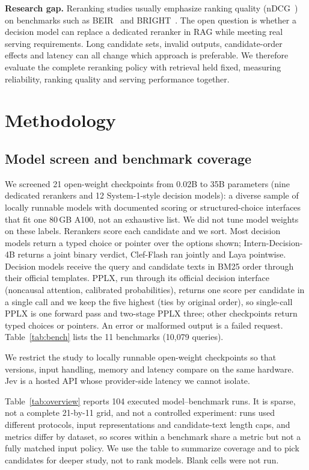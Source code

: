 \documentclass[conference]{IEEEtran}
\begin{document}
{\textbf{Research gap.} Reranking studies usually emphasize ranking quality (nDCG~\cite{jarvelin2002ndcg}) on benchmarks such as BEIR~\cite{thakur2021beir} and BRIGHT~\cite{su2025bright}. The open question is whether a decision model can replace a dedicated reranker in RAG while meeting real serving requirements. Long candidate sets, invalid outputs, candidate-order effects and latency can all change which approach is preferable. We therefore evaluate the complete reranking policy with retrieval held fixed, measuring reliability, ranking quality and serving performance together.

\section{Methodology}
\subsection{Model screen and benchmark coverage}\label{sec:screen}
We screened 21 open-weight checkpoints from 0.02B to 35B parameters (nine dedicated rerankers and 12 System-1-style decision models): a diverse sample of locally runnable models with documented scoring or structured-choice interfaces that fit one 80\,GB A100, not an exhaustive list. We did not tune model weights on these labels. Rerankers score each candidate and we sort. Most decision models return a typed choice or pointer over the options shown; Intern-Decision-4B returns a joint binary verdict, Clef-Flash ran jointly and Laya pointwise. Decision models receive the query and candidate texts in BM25 order through their official templates. PPLX, run through its official decision interface (noncausal attention, calibrated probabilities), returns one score per candidate in a single call and we keep the five highest (ties by original order), so single-call PPLX is one forward pass and two-stage PPLX three; other checkpoints return typed choices or pointers. An error or malformed output is a failed request. Table~\ref{tab:bench} lists the 11 benchmarks (10,079 queries).

We restrict the study to locally runnable open-weight checkpoints so that versions, input handling, memory and latency compare on the same hardware. Jev is a hosted API whose provider-side latency we cannot isolate.




Table~\ref{tab:overview} reports 104 executed model--benchmark runs. It is sparse, not a complete 21-by-11 grid, and not a controlled experiment: runs used different protocols, input representations and candidate-text length caps, and metrics differ by dataset, so scores within a benchmark share a metric but not a fully matched input policy. We use the table to summarize coverage and to pick candidates for deeper study, not to rank models. Blank cells were not run.

}
\end{document}
